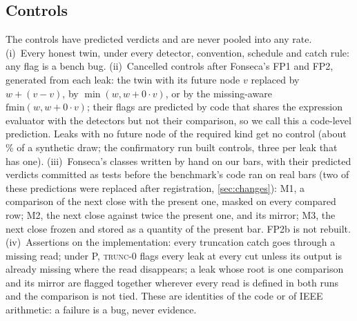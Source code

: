 \documentclass[11pt]{article}
\newcommand{\TZ}{\textsc{trunc-0}}
\newcommand{\pct}{\%}
\begin{document}
\subsection{Controls}\label{sec:controls}
The controls have predicted verdicts and are never pooled into any rate.
(i)~Every honest twin, under every detector, convention, schedule and catch rule: any flag is a
bench bug. (ii)~Cancelled controls after Fonseca's FP1 and FP2, generated from each leak: the twin
with its future node $v$ replaced by $w + (v - v)$, by $\min(w, w + 0\cdot v)$, or by the
missing-aware $\mathrm{fmin}(w, w + 0\cdot v)$; their flags are predicted by code that shares the
expression evaluator with the detectors but not their comparison, so we call this a code-level
prediction. Leaks with no future node of the required kind get no control (about \NumNoControlShare\pct{} of a synthetic draw; the confirmatory run built \NumCControlsBuilt{} controls, three per leak that has one). (iii)~Fonseca's classes written by hand on our bars, with their predicted verdicts
committed as tests before the benchmark's code ran on real bars (two of these predictions were replaced
after registration, \cref{sec:changes}): M1, a comparison of the next close with the
present one, masked on every compared row; M2, the next close against twice the present one, and
its mirror; M3, the next close frozen and stored as a quantity of the present bar. FP2b is not
rebuilt. (iv)~Assertions on the implementation: every truncation catch goes through a missing read;
under P, \TZ{} flags every leak at every cut unless its output is already missing where the read
disappears; a leak whose root is one comparison and its mirror are flagged together wherever every
read is defined in both runs and the comparison is not tied. These are identities of the code or of
IEEE arithmetic: a failure is a bug, never evidence.
\end{document}
